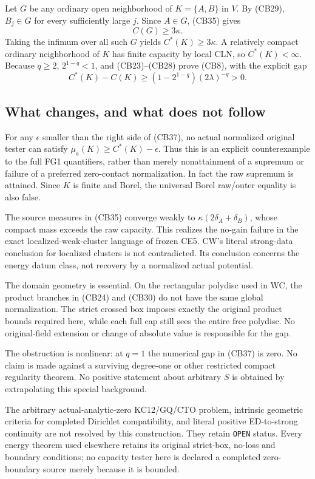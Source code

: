 Let $G$ be any ordinary open neighborhood of $K=\{A,B\}$ in
$V$. By (CB29), $B_j\in G$ for every sufficiently large $j$.
Since $A\in G$, (CB35) gives
\[
                             C(G)\ge3\kappa.
 \tag{CB36}
\]
Taking the infimum over all such $G$ yields $C^*(K)\ge3\kappa$.
A relatively compact ordinary neighborhood of $K$ has finite
capacity by local CLN, so $C^*(K)<\infty$. Because $q\ge2$,
$2^{1-q}<1$, and (CB23)--(CB28) prove (CB8), with the explicit
gap
\[
                      C^*(K)-C(K)
                         \ge(1-2^{1-q})(2\lambda)^{-q}>0.
 \tag{CB37}
\]

\subsection{What changes, and what does not follow}

For any $\epsilon$ smaller than the right side of (CB37), no
actual normalized original tester can satisfy
$\mu_a(K)\ge C^*(K)-\epsilon$. Thus this is an explicit
counterexample to the full FG1 quantifiers, rather than merely
nonattainment of a supremum or failure of a preferred
zero-contact normalization. In fact the raw supremum is
attained. Since $K$ is finite and Borel, the universal Borel
raw/outer equality is also false.

The source measures in (CB35) converge weakly to
$\kappa(2\delta_A+\delta_B)$, whose compact mass exceeds the
raw capacity. This realizes the no-gain failure in the exact
localized-weak-cluster language of frozen CE5. CW's literal
strong-data conclusion for localized clusters is not
contradicted. Its conclusion concerns the energy datum class,
not recovery by a normalized actual potential.

The domain geometry is essential. On the rectangular polydisc
used in WC, the product branches in (CB24) and (CB30) do not
have the same global normalization. The strict crossed box
imposes exactly the original product bounds required here,
while each full cap still sees the entire free polydisc.
No original-field extension or change of absolute value is
responsible for the gap.

The obstruction is nonlinear: at $q=1$ the numerical gap in
(CB37) is zero. No claim is made against a surviving
degree-one or other restricted compact regularity theorem.
No positive statement about arbitrary $S$ is obtained by
extrapolating this special background.

The arbitrary actual-analytic-zero KC12/GQ/CTO problem,
intrinsic geometric criteria for completed Dirichlet
compatibility, and literal positive ED-to-strong continuity
are not resolved by this construction. They retain
\texttt{OPEN} status. Every energy theorem used elsewhere
retains its original strict-box, no-loss and boundary
conditions; no capacity tester here is declared a completed
zero-boundary source merely because it is bounded.

